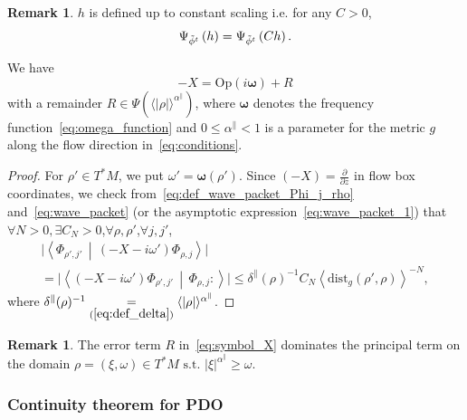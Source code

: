 \documentclass[10pt]{amsart}
\theoremstyle{definition}\newtheorem{defi}[theo]{Definition}\newtheorem{rema}[theo]{Remark}\newtheorem{exam}[theo]{Example}\newtheorem{exem}[theo]{Example}\newtheorem{nota}[theo]{Notation}
\newcommand*\eq[1]{\underset{(#1)}{=}}
\newcommand{\dist}{\mathrm{dist}}
\newcommand{\Opp}{\mathrm{Op}}
\let\oldtilde\tilde
\renewcommand*{\tilde}[1]{\mathchoice{\widetilde{#1}}{\widetilde{#1}}{\oldtilde{#1}}{\oldtilde{#1}}}
\let\oldexists\exists
\renewcommand*{\exists}{\mathrel{\oldexists}}
\let\oldforall\forall
\renewcommand*{\forall}{\mathrel{\oldforall}}
\begin{document}
\begin{rema}
$h$ is defined up to constant scaling i.e. for any $C>0$,
\[
\Psi_{\tilde{\phi}^{t}}\left(h\right)=\Psi_{\tilde{\phi}^{t}}\left(Ch\right).
\]
\end{rema}

\begin{cBoxB}{}
\begin{prop}\label{prop:We-havewith-a}
We have
\begin{equation}
-X=\Opp \left(i\boldsymbol{\omega}\right)+R\label{eq:symbol_X}
\end{equation}
with a remainder $R\in\Psi(\langle |\rho|\rangle ^{\alpha^{\parallel}})$, where $\boldsymbol{\omega}$ denotes the frequency function~\eqref{eq:omega_function} and $0\leq\alpha^{\parallel}<1$ is a parameter for the metric $g$ along the flow direction in~\eqref{eq:conditions}.
\end{prop}
\end{cBoxB}

\begin{proof}
For $\rho'\in T^{*}M$, we put $\omega'=\boldsymbol{\omega}(\rho')$. Since $(-X)=\frac{\partial}{\partial z}$ in flow box coordinates, we check from~\eqref{eq:def_wave_packet_Phi_j_rho} and~\eqref{eq:wave_packet} (or the asymptotic expression~\eqref{eq:wave_packet_1}) that $\forall N>0,\exists C_{N}>0$,$\forall\rho,\rho'$,$\forall j,j'$,
\begin{multline}\label{eq:X_omega}
\big|\left\langle\Phi_{\rho',j'}\,\middle|\,\left(-X-i\omega'\right)\Phi_{\rho,j}\right\rangle\big|\\
=\big|\left\langle\left(-X-i\omega'\right)\Phi_{\rho',j'}\,\middle|\,\Phi_{\rho,j}:\right\rangle\big|\leq\delta^{\parallel}\left(\rho\right)^{-1}C_{N}\left\langle \dist_{g}\left(\rho',\rho\right)\right\rangle^{-N},
\end{multline}
where $\delta^{\parallel}(\rho)^{-1}\eq{\ref{eq:def_delta}}\langle |\rho|\rangle ^{\alpha^{\parallel}}$.
\end{proof}

\begin{rema}
The error term $R$ in~\eqref{eq:symbol_X} dominates the principal term on the domain $\rho=(\xi,\omega)\in T^{*}M\text{ s.t. }|\xi|^{\alpha^{\parallel}}\geq\omega$.
\end{rema}


\subsubsection{Continuity theorem for PDO}
\end{document}
